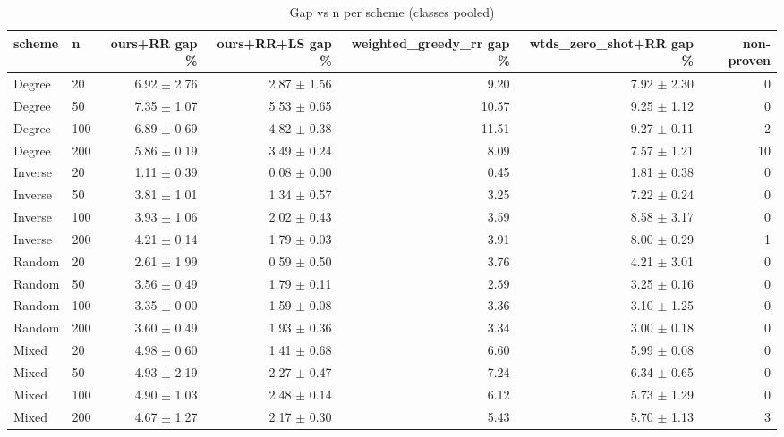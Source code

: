 \begin{table}[t]
\centering
\small
\caption{Gap vs n per scheme (classes pooled)}
\begin{tabular}{llrrrrr}
\toprule
scheme & n & ours+RR gap \% & ours+RR+LS gap \% & weighted\_greedy\_rr gap \% & wtds\_zero\_shot+RR gap \% & non-proven \\
\midrule
Degree & 20 & 6.92 $\pm$ 2.76 & 2.87 $\pm$ 1.56 & 9.20 & 7.92 $\pm$ 2.30 & 0 \\
Degree & 50 & 7.35 $\pm$ 1.07 & 5.53 $\pm$ 0.65 & 10.57 & 9.25 $\pm$ 1.12 & 0 \\
Degree & 100 & 6.89 $\pm$ 0.69 & 4.82 $\pm$ 0.38 & 11.51 & 9.27 $\pm$ 0.11 & 2 \\
Degree & 200 & 5.86 $\pm$ 0.19 & 3.49 $\pm$ 0.24 & 8.09 & 7.57 $\pm$ 1.21 & 10 \\
Inverse & 20 & 1.11 $\pm$ 0.39 & 0.08 $\pm$ 0.00 & 0.45 & 1.81 $\pm$ 0.38 & 0 \\
Inverse & 50 & 3.81 $\pm$ 1.01 & 1.34 $\pm$ 0.57 & 3.25 & 7.22 $\pm$ 0.24 & 0 \\
Inverse & 100 & 3.93 $\pm$ 1.06 & 2.02 $\pm$ 0.43 & 3.59 & 8.58 $\pm$ 3.17 & 0 \\
Inverse & 200 & 4.21 $\pm$ 0.14 & 1.79 $\pm$ 0.03 & 3.91 & 8.00 $\pm$ 0.29 & 1 \\
Random & 20 & 2.61 $\pm$ 1.99 & 0.59 $\pm$ 0.50 & 3.76 & 4.21 $\pm$ 3.01 & 0 \\
Random & 50 & 3.56 $\pm$ 0.49 & 1.79 $\pm$ 0.11 & 2.59 & 3.25 $\pm$ 0.16 & 0 \\
Random & 100 & 3.35 $\pm$ 0.00 & 1.59 $\pm$ 0.08 & 3.36 & 3.10 $\pm$ 1.25 & 0 \\
Random & 200 & 3.60 $\pm$ 0.49 & 1.93 $\pm$ 0.36 & 3.34 & 3.00 $\pm$ 0.18 & 0 \\
Mixed & 20 & 4.98 $\pm$ 0.60 & 1.41 $\pm$ 0.68 & 6.60 & 5.99 $\pm$ 0.08 & 0 \\
Mixed & 50 & 4.93 $\pm$ 2.19 & 2.27 $\pm$ 0.47 & 7.24 & 6.34 $\pm$ 0.65 & 0 \\
Mixed & 100 & 4.90 $\pm$ 1.03 & 2.48 $\pm$ 0.14 & 6.12 & 5.73 $\pm$ 1.29 & 0 \\
Mixed & 200 & 4.67 $\pm$ 1.27 & 2.17 $\pm$ 0.30 & 5.43 & 5.70 $\pm$ 1.13 & 3 \\
\bottomrule
\end{tabular}
\end{table}
